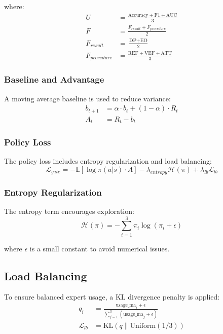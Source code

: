 \documentclass[11pt]{article}
\begin{document}
where:
\begin{align}
    U &= \frac{\text{Accuracy} + \text{F1} + \text{AUC}}{3} \\
    F &= \frac{F_{result} + F_{procedure}}{2} \\
    F_{result} &= \frac{\text{DP} + \text{EO}}{2} \\
    F_{procedure} &= \frac{\text{REF} + \text{VEF} + \text{ATT}}{3}
\end{align}

\subsubsection{Baseline and Advantage}
A moving average baseline is used to reduce variance:
\begin{align}
    b_{t+1} &= \alpha \cdot b_t + (1-\alpha) \cdot R_t \\
    A_t &= R_t - b_t
\end{align}

\subsubsection{Policy Loss}
The policy loss includes entropy regularization and load balancing:
\begin{equation}
    \mathcal{L}_{gate} = -\mathbb{E}[\log \pi(a|s) \cdot A] - \lambda_{entropy} \mathcal{H}(\pi) + \lambda_{lb} \mathcal{L}_{lb}
\end{equation}

\subsubsection{Entropy Regularization}
The entropy term encourages exploration:
\begin{equation}
    \mathcal{H}(\pi) = -\sum_{i=1}^3 \pi_i \log(\pi_i + \epsilon)
\end{equation}

where $\epsilon$ is a small constant to avoid numerical issues.

\subsection{Load Balancing}
To ensure balanced expert usage, a KL divergence penalty is applied:
\begin{align}
    q_i &= \frac{\text{usage\_ma}_i + \epsilon}{\sum_{j=1}^3 (\text{usage\_ma}_j + \epsilon)} \\
    \mathcal{L}_{lb} &= \text{KL}(q \| \text{Uniform}(1/3))
\end{align}
\end{document}
